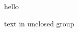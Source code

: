 \documentclass{article}
\begin{document}
hello
\begingroup\raggedright text in unclosed group
\end{document}
